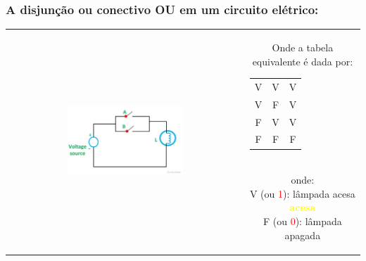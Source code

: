 \documentclass{beamer}
\begin{document}
\begin{frame}
\frametitle{A \textbf{disjunção} ou conectivo \textbf{OU}  em um circuito elétrico:}

\begin{tabular}{c||c}  
 
 \includegraphics[height=0.5\textheight,width=0.5\textwidth]{figuras/circuito_OR.jpg} 
 
  &
  \parbox{0.4\linewidth}{\vspace{-4cm} Onde a tabela equivalente é dada por:\\
  	\begin{tabular}{|c|c|c|}
	\hline
	$\mathbf{A}$ & $\mathbf{B}$ & $\mathbf{A \vee B}$ \\
	\hline
	V & V & V \\
	\hline
	V & F & V \\
	\hline
	F & V & V \\
	\hline
	F & F & F \\
	\hline
	\end{tabular}\\
  onde:\\
	V (ou  \textcolor{red}{1}): lâmpada acesa \textbf{\textcolor{yellow}{acesa}}\\
	F (ou \textcolor{red}{0}): lâmpada apagada\\

  } %

\end{tabular} 	

\end{frame}
\end{document}
